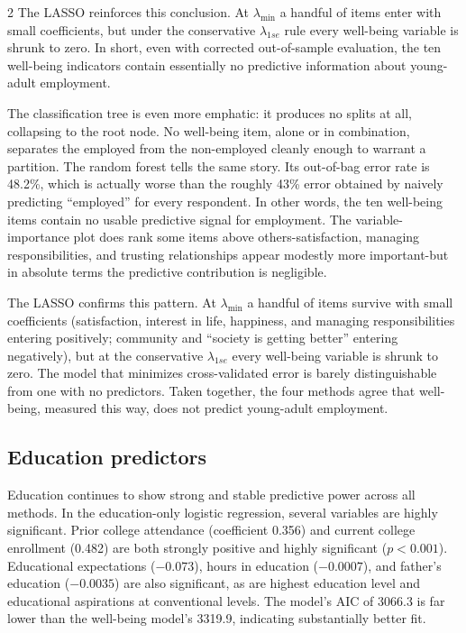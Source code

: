 \documentclass[
  11pt,
]{article}
\begin{document}
\begin{multicols}{2}
The LASSO reinforces this conclusion. At $\lambda_{\min}$ a handful of items enter with small coefficients, but under the conservative $\lambda_{1se}$ rule every well-being variable is shrunk to zero. In short, even with corrected out-of-sample evaluation, the ten well-being indicators contain essentially no predictive information about young-adult employment.


The classification tree is even more emphatic: it produces no splits at all, collapsing to the root node. No well-being item, alone or in combination, separates the employed from the non-employed cleanly enough to warrant a partition. The random forest tells the same story. Its out-of-bag error rate is 48.2\%, which is actually worse than the roughly 43\% error obtained by naively predicting ``employed'' for every respondent. In other words, the ten well-being items contain no usable predictive signal for employment. The variable-importance plot does rank some items above others-satisfaction, managing responsibilities, and trusting relationships appear modestly more important-but in absolute terms the predictive contribution is negligible.

The LASSO confirms this pattern. At $\lambda_{\min}$ a handful of items survive with small coefficients (satisfaction, interest in life, happiness, and managing responsibilities entering positively; community and ``society is getting better'' entering negatively), but at the conservative $\lambda_{1se}$ every well-being variable is shrunk to zero. The model that minimizes cross-validated error is barely distinguishable from one with no predictors. Taken together, the four methods agree that well-being, measured this way, does not predict young-adult employment.

\subsection{Education predictors}

Education continues to show strong and stable predictive power across all methods. In the education-only logistic regression, several variables are highly significant. Prior college attendance (coefficient 0.356) and current college enrollment (0.482) are both strongly positive and highly significant ($p < 0.001$). Educational expectations ($-0.073$), hours in education ($-0.0007$), and father's education ($-0.0035$) are also significant, as are highest education level and educational aspirations at conventional levels. The model's AIC of 3066.3 is far lower than the well-being model's 3319.9, indicating substantially better fit.


\end{multicols}
\end{document}
